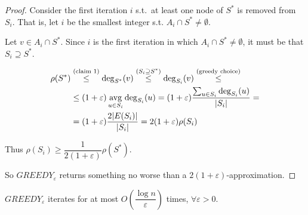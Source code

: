 \begin{proof}
        Consider the first iteration $i$ s.t.~at least one node of $S^*$ is removed from $S_i$.
        That is, let $i$ be the smallest integer s.t. $A_i \cap S^* \neq \emptyset$.

        Let $v \in A_i \cap S^*$. Since $i$ is the first iteration in which $A_i \cap S^* \neq \emptyset$, it must be that $S_i \supseteq S^*$.


        \begin{equation*}
            \begin{split}
                \rho(S^*)   &\overset{(\text{claim 1})}{\leq} \deg_{S^*}(v) \overset{(S_i \supseteq S^*)}{\leq} \deg_{S_i}(v) \overset{(\text{greedy choice})}{\leq}\\
                            &\leq (1+\varepsilon) \operatorname*{avg}_{u \in S_i} \deg_{S_i}(u) = (1+\varepsilon) \dfrac{\sum_{u \in S_i} \deg_{S_i}(u)}{\vert S_i \vert} =\\
                            &= (1+\varepsilon) \dfrac{2 \vert E(S_i) \vert}{\vert S_i \vert} = 2 (1+\varepsilon) \rho(S_i)
            \end{split}
        \end{equation*}

        Thus $\rho(S_i) \geq \dfrac{1}{2(1+\varepsilon)} \rho(S^*)$.

        So $GREEDY_\varepsilon$ returns something no worse than a $2(1+\varepsilon)$-approximation.
    \end{proof}

    \begin{lemma}\label{lemma:ds_greedy_2}
        $GREEDY_\varepsilon$ iterates for at most $O(\dfrac{\log n}{\varepsilon})$ times, $\forall \varepsilon > 0$.
    \end{lemma}

